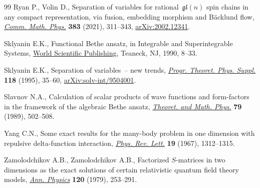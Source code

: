 \begin{thebibliography}{99}
Ryan P., Volin D., Separation of variables for rational~{$\mathfrak{gl}(n)$}
 spin chains in any compact representation, via fusion, embedding morphism and
 {B}\"acklund flow,
 \href{https://doi.org/10.1007/s00220-021-03990-7}{\textit{Comm. Math. Phys.}}
 \textbf{383} (2021), 311--343,
 \href{http://arxiv.org/abs/2002.12341}{arXiv:2002.12341}.

Sklyanin E.K., Functional {B}ethe ansatz, in Integrable and {S}uperintegrable
 {S}ystems, \href{https://doi.org/10.1142/9789812797179_0002}{World Scientific
 Publishing}, Teaneck, NJ, 1990, 8--33.

Sklyanin E.K., Separation of variables~-- new trends,
 \href{https://doi.org/10.1143/PTPS.118.35}{\textit{Progr. Theoret. Phys.
 Suppl.}} \textbf{118} (1995), 35--60,
 \href{http://arxiv.org/abs/solv-int/9504001}{arXiv:solv-int/9504001}.

Slavnov N.A., Calculation of scalar products of wave functions and form-factors
 in the framework of the algebraic {B}ethe ansatz,
 \href{https://doi.org/10.1007/BF01016531}{\textit{Theoret. and Math. Phys.}}
 \textbf{79} (1989), 502--508.

Yang C.N., Some exact results for the many-body problem in one dimension with
 repulsive delta-function interaction,
 \href{https://doi.org/10.1103/PhysRevLett.19.1312}{\textit{Phys. Rev. Lett.}}
 \textbf{19} (1967), 1312--1315.

Zamolodchikov A.B., Zamolodchikov A.B., Factorized {$S$}-matrices in two
 dimensions as the exact solutions of certain relativistic quantum field
 theory models,
 \href{https://doi.org/10.1016/0003-4916(79)90391-9}{\textit{Ann. Physics}}
 \textbf{120} (1979), 253--291.

\end{thebibliography}
